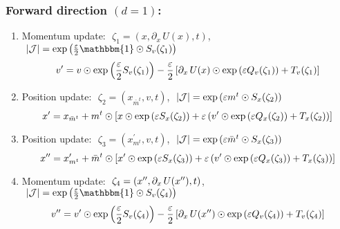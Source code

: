 \documentclass[../main.tex]{subfiles}
\begin{document}
%
\clearpage
%
\subsubsection{Forward direction \texorpdfstring{$(d = 1)$}{(d = 1)}:}%
\label{subsubsec:augmented_leapfrog_equations_forward}
%
\begin{enumerate}
  \item Momentum update: $\,\,\zeta_{1} = (x, \partial_{x}\, U(x), t)$,
    $\,\, |\mathcal{J}| = \exp{\left(\frac{\eps}{2}\mathbbm{1}\odot S_{v}(\zeta_1)\right)}$
    \vspace{-20pt}
    \begin{equation}
      \vp = v \odot \exp{\left(\frac{\eps}{2}S_{v}(\zeta_{1})\right)}%
        - \frac{\eps}{2}\left[\partial_{x}\,U(x)\odot \exp{\left(\eps Q_{v}(\zeta_{1})\right)}%
        + T_{v}(\zeta_{1})\right]
    \end{equation}
    \vspace{-50pt}
  \item Position update: $\,\,\zeta_{2} = (x_{\bar{m}^{t}}, v, t)$,
    $\,\, |\mathcal{J}| = \exp{\left({\varepsilon}m^{t}\odot S_{x}(\zeta_2)\right)}$
    \vspace{-20pt}
    \begin{equation}
      \xp = x_{\bar{m}^{t}} + m^{t}\odot \left[x \odot \exp{\left(\eps S_{x}(\zeta_{2})\right)}%
        + \eps\left(\vp\odot\exp{\left(\eps Q_{x}(\zeta_{2})\right)} + T_{x}(\zeta_{2})\right)\right]
    \end{equation}
    \vspace{-50pt}
  \item Position update: $\,\,\zeta_{3} = (x^{\prime}_{m^{t}}, v, t)$,
    $\,\, |\mathcal{J}| = \exp{\left({\varepsilon}\bar{m}^{t}\odot S_{x}(\zeta_3)\right)}$
    \vspace{-20pt}
    \begin{equation}
      \xpp = x^{\prime}_{m^{t}} + \bar{m}^{t}\odot \left[\xp \odot \exp{\left(\eps S_{x}(\zeta_{3})\right)}%
        + \eps\left(\vp\odot\exp{\left(\eps Q_{x}(\zeta_{3})\right)} + T_{x}(\zeta_{3})\right)\right]
    \end{equation}
    \vspace{-50pt}
  \item Momentum update: $\,\,\zeta_{4} = ({x^{\prime\prime}}, \partial_{x}\, U({x^{\prime\prime}}), t)$,
    $\,\, |\mathcal{J}| = \exp{\left(\frac{\eps}{2}\mathbbm{1}\odot S_{v}(\zeta_{4})\right)}$
    \vspace{-20pt}
    \begin{equation}
      \vpp = \vp \odot \exp{\left(\frac{\eps}{2}S_{v}(\zeta_{4})\right)}%
        - \frac{\eps}{2}\left[\partial_{x}\,U(\xpp)\odot \exp{\left(\eps Q_{v}(\zeta_{4})\right)}%
          + T_{v}(\zeta_{4})\right]
    \end{equation}
\end{enumerate}
\vspace{-20pt}
%
\end{document}
